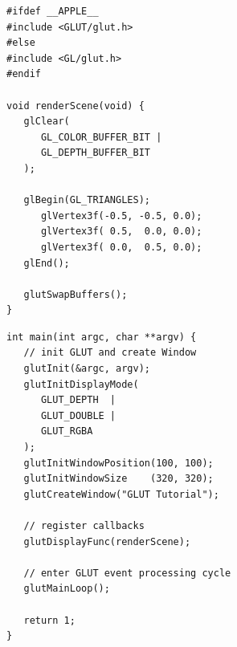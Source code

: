 
\begin{frame}[fragile, t]
%
%
\begin{codebox}
\begin{verbatim}
#ifdef __APPLE__
#include <GLUT/glut.h>
#else
#include <GL/glut.h>
#endif

void renderScene(void) {
   glClear(
      GL_COLOR_BUFFER_BIT | 
      GL_DEPTH_BUFFER_BIT
   );

   glBegin(GL_TRIANGLES);
      glVertex3f(-0.5, -0.5, 0.0);
      glVertex3f( 0.5,  0.0, 0.0);
      glVertex3f( 0.0,  0.5, 0.0);
   glEnd();

   glutSwapBuffers();
}
\end{verbatim}
\end{codebox}
%
\begin{codebox}
\begin{verbatim}
int main(int argc, char **argv) {
   // init GLUT and create Window
   glutInit(&argc, argv);
   glutInitDisplayMode(
      GLUT_DEPTH  | 
      GLUT_DOUBLE | 
      GLUT_RGBA
   );
   glutInitWindowPosition(100, 100);
   glutInitWindowSize    (320, 320);
   glutCreateWindow("GLUT Tutorial");

   // register callbacks
   glutDisplayFunc(renderScene);

   // enter GLUT event processing cycle
   glutMainLoop();

   return 1;
}
\end{verbatim}
\end{codebox}
%
\end{frame}


